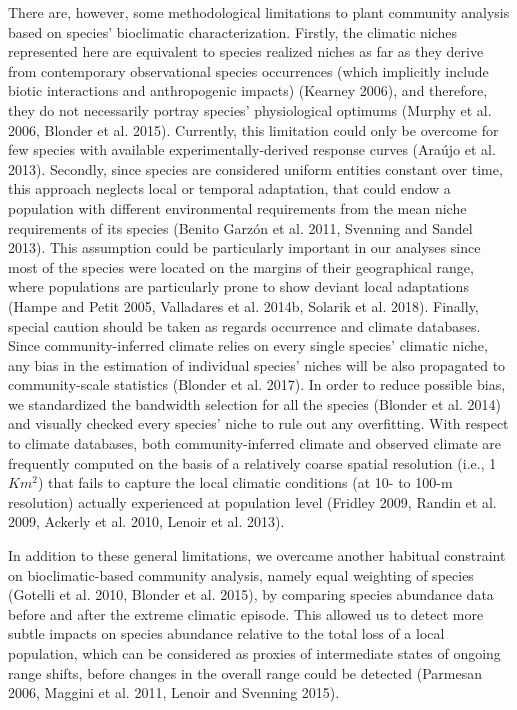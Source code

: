 \documentclass[11pt,twoside]{reedthesis}
\begin{document}
There are, however, some methodological limitations to plant community
analysis based on species' bioclimatic characterization. Firstly, the
climatic niches represented here are equivalent to species realized
niches as far as they derive from contemporary observational species
occurrences (which implicitly include biotic interactions and
anthropogenic impacts) (Kearney 2006), and therefore, they do not
necessarily portray species' physiological optimums (Murphy et al. 2006,
Blonder et al. 2015). Currently, this limitation could only be overcome
for few species with available experimentally-derived response curves
(Araújo et al. 2013). Secondly, since species are considered uniform
entities constant over time, this approach neglects local or temporal
adaptation, that could endow a population with different environmental
requirements from the mean niche requirements of its species (Benito
Garzón et al. 2011, Svenning and Sandel 2013). This assumption could be
particularly important in our analyses since most of the species were
located on the margins of their geographical range, where populations
are particularly prone to show deviant local adaptations (Hampe and
Petit 2005, Valladares et al. 2014b, Solarik et al. 2018). Finally,
special caution should be taken as regards occurrence and climate
databases. Since community-inferred climate relies on every single
species' climatic niche, any bias in the estimation of individual
species' niches will be also propagated to community-scale statistics
(Blonder et al. 2017). In order to reduce possible bias, we standardized
the bandwidth selection for all the species (Blonder et al. 2014) and
visually checked every species' niche to rule out any overfitting. With
respect to climate databases, both community-inferred climate and
observed climate are frequently computed on the basis of a relatively
coarse spatial resolution (i.e., 1 \(Km^2\)) that fails to capture the
local climatic conditions (at 10- to 100-m resolution) actually
experienced at population level (Fridley 2009, Randin et al. 2009,
Ackerly et al. 2010, Lenoir et al. 2013).\par

In addition to these general limitations, we overcame another habitual
constraint on bioclimatic-based community analysis, namely equal
weighting of species (Gotelli et al. 2010, Blonder et al. 2015), by
comparing species abundance data before and after the extreme climatic
episode. This allowed us to detect more subtle impacts on species
abundance relative to the total loss of a local population, which can be
considered as proxies of intermediate states of ongoing range shifts,
before changes in the overall range could be detected (Parmesan 2006,
Maggini et al. 2011, Lenoir and Svenning 2015).\par
\end{document}
